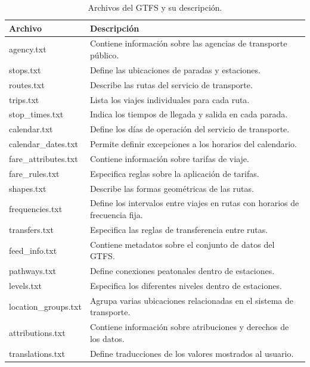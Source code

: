 \documentclass[openany]{book}
\begin{document}
    \begin{table}[h]
        \centering
        \begin{tabular}{|l|p{10cm}|}
            \hline
            \textbf{Archivo} & \textbf{Descripción} \\
            \hline
            agency.txt & Contiene información sobre las agencias de transporte público. \\
            stops.txt & Define las ubicaciones de paradas y estaciones. \\
            routes.txt & Describe las rutas del servicio de transporte. \\
            trips.txt & Lista los viajes individuales para cada ruta. \\
            stop\_times.txt & Indica los tiempos de llegada y salida en cada parada. \\
            calendar.txt & Define los días de operación del servicio de transporte. \\
            calendar\_dates.txt & Permite definir excepciones a los horarios del calendario. \\
            fare\_attributes.txt & Contiene información sobre tarifas de viaje. \\
            fare\_rules.txt & Especifica reglas sobre la aplicación de tarifas. \\
            shapes.txt & Describe las formas geométricas de las rutas. \\
            frequencies.txt & Define los intervalos entre viajes en rutas con horarios de frecuencia fija. \\
            transfers.txt & Especifica las reglas de transferencia entre rutas. \\
            feed\_info.txt & Contiene metadatos sobre el conjunto de datos del GTFS. \\
            pathways.txt & Define conexiones peatonales dentro de estaciones. \\
            levels.txt & Especifica los diferentes niveles dentro de estaciones. \\
            location\_groups.txt & Agrupa varias ubicaciones relacionadas en el sistema de transporte. \\
            attributions.txt & Contiene información sobre atribuciones y derechos de los datos. \\
            translations.txt & Define traducciones de los valores mostrados al usuario. \\

            \hline
        \end{tabular}
        \caption{Archivos del GTFS y su descripción.}
        \label{tab:gtfs_files}
    \end{table}
\end{document}
